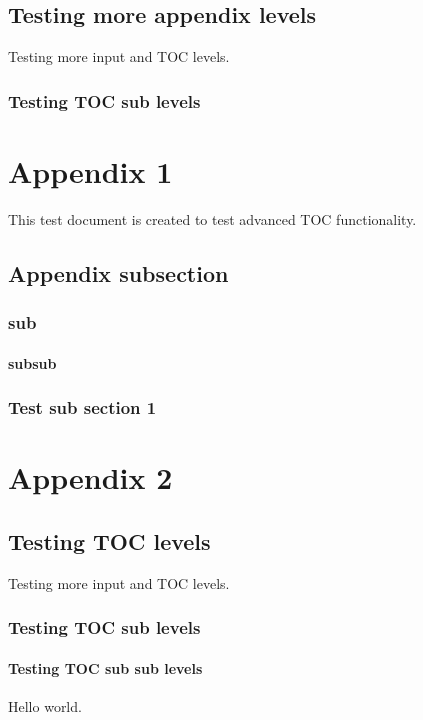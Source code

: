 \documentclass{book}
\begin{document}
\section{Testing more appendix levels}
Testing more input and TOC levels.

\subsection{Testing TOC sub levels}

\appendix

\chapter{Appendix 1}
This test document is created to test advanced TOC functionality.

\section{Appendix subsection}

\subsection{sub}

\subsubsection{subsub}


\subsection{Test sub section 1}

\chapter{Appendix 2}

\section{Testing TOC levels}
Testing more input and TOC levels.

\subsection{Testing TOC sub levels}

\subsubsection{Testing TOC sub sub levels}
Hello world.
\end{document}
